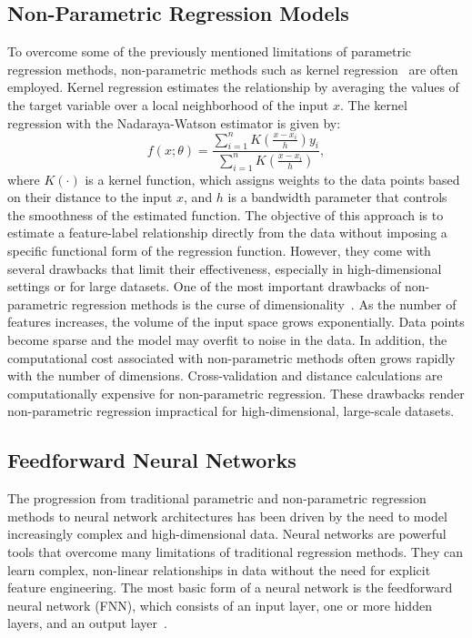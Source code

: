 \subsection{Non-Parametric Regression Models}
To overcome some of the previously mentioned limitations of parametric regression methods, non-parametric methods such as kernel regression~\citep{hastie2009elements} are often employed.
Kernel regression estimates the relationship by averaging the values of the target variable over a local neighborhood of the input $x$.
The kernel regression with the Nadaraya-Watson estimator is given by:
\begin{equation}
    f(x; \theta) = \frac{\sum_{i=1}^{n} K\left(\frac{x-x_i}{h}\right) y_i}{\sum_{i=1}^{n} K\left(\frac{x-x_i}{h}\right)},
\end{equation}
where $K(\cdot)$ is a kernel function, which assigns weights to the data points based on their distance to the input $x$, and $h$ is a bandwidth parameter that controls the smoothness of the estimated function.
The objective of this approach is to estimate a feature-label relationship directly from the data without imposing a specific functional form of the regression function.
However, they come with several drawbacks that limit their effectiveness, especially in high-dimensional settings or for large datasets.
One of the most important drawbacks of non-parametric regression methods is the curse of dimensionality~\cite{bellman1966dynamic}.
As the number of features increases, the volume of the input space grows exponentially.
Data points become sparse and the model may overfit to noise in the data.
In addition, the computational cost associated with non-parametric methods often grows rapidly with the number of dimensions.
Cross-validation and distance calculations are computationally expensive for non-parametric regression.
These drawbacks render non-parametric regression impractical for high-dimensional, large-scale datasets.

\subsection{Feedforward Neural Networks}

The progression from traditional parametric and non-parametric regression methods to neural network architectures has been driven by the need to model increasingly complex and high-dimensional data.
Neural networks are powerful tools that overcome many limitations of traditional regression methods.
They can learn complex, non-linear relationships in data without the need for explicit feature engineering.
The most basic form of a neural network is the feedforward neural network (FNN), which consists of an input layer, one or more hidden layers, and an output layer~\citep{goodfellow2016}.

